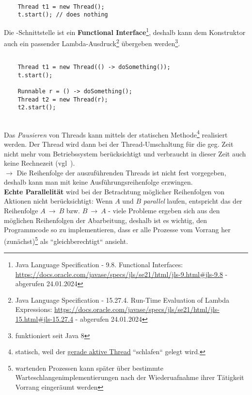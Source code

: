 \begin{verbatim}

    Thread t1 = new Thread();
    t.start(); // does nothing

\end{verbatim}


Die -Schnittstelle ist ein \textbf{Functional Interface}\footnote{
    Java Language Specification - 9.8. Functional Interfaces: \url{https://docs.oracle.com/javase/specs/jls/se21/html/jls-9.html#jls-9.8} - abgerufen 24.01.2024
}, deshalb kann dem Konstruktor auch ein passender Lambda-Ausdruck\footnote{
    Java Language Specification - 15.27.4. Run-Time Evaluation of Lambda Expressions: \url{https://docs.oracle.com/javase/specs/jls/se21/html/jls-15.html#jls-15.27.4}  - abgerufen 24.01.2024
} übergeben werden\footnote{funktioniert seit Java 8}.

\begin{verbatim}

    Thread t1 = new Thread(() -> doSomething());
    t.start();

    Runnable r = () -> doSomething();
    Thread t2 = new Thread(r);
    t2.start();

\end{verbatim}\\

Das \textit{Pausieren} von Threads kann mittels der statischen Methode\footnote{
    statisch, weil der \underline{gerade aktive Thread} ``schlafen`` gelegt wird.
}  realisiert werden.
Der Thread wird dann bei der Thread-Umschaltung für die geg. Zeit nicht mehr vom Betriebssystem berücksichtigt und verbraucht in dieser Zeit auch keine Rechnezeit (vgl~\cite[16]{Oec22}).\\

$\rightarrow$ Die Reihenfolge der auszuführenden Threads ist nicht fest vorgegeben, deshalb kann man mit  keine Ausführungsreihenfolge erzwingen.\\

\textbf{Echte Parallelität} wird bei der Betrachtung möglicher Reihenfolgen von Aktionen nicht berücksichtigt: Wenn $A$ und $B$ \textit{parallel} laufen, entspricht das der Reihenfolge $A\ \rightarrow\ B$ bzw. $B\ \rightarrow\ A$ - viele Probleme ergeben sich aus den möglichen Reihenfolgen der Abarbeitung, deshalb ist es wichtig, den Programmcode so zu implementieren, dass er alle Prozesse vom Vorrang her (zunächst)\footnote{
wartenden Prozessen kann später über bestimmte Warteschlangenimplementierungen nach der Wiederuafnahme ihrer Tätigkeit Vorrang eingeräumt werden
} als ``gleichberechtigt`` ansieht.

